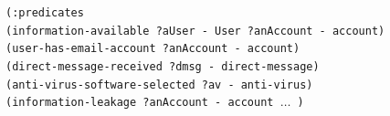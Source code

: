 \begin{figure}[pbt]
{{{{}
\hspace*{35pt}\texttt{(:predicates \\
\hspace*{35pt}(information-available ?aUser - User ?anAccount - account) \\
\hspace*{35pt}(user-has-email-account ?anAccount - account)\\
\hspace*{35pt}(direct-message-received ?dmsg - direct-message)\\
\hspace*{35pt}(anti-virus-software-selected ?av - anti-virus) \\
\hspace*{35pt}(information-leakage ?anAccount - account $\ldots$ )\\[15pt]
}


}}}
\end{figure}
